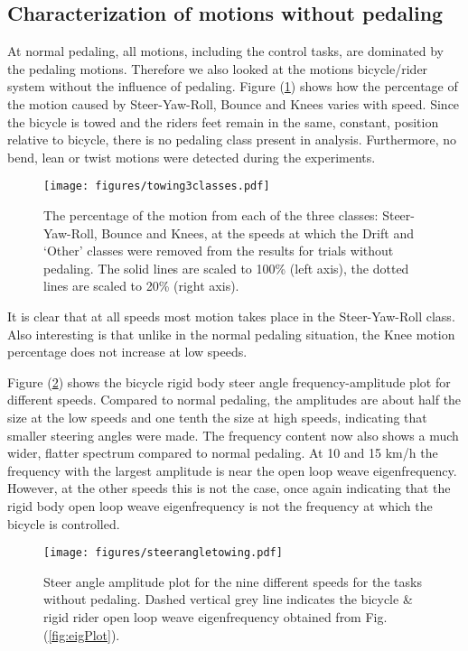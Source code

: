\subsection{Characterization of motions without pedaling}
\label{sec:noPed}
At normal pedaling, all motions, including the control tasks, are dominated by
the pedaling motions. Therefore we also looked at the motions bicycle/rider
system without the influence of pedaling. Figure (\ref{missjellybean}) shows
how the percentage of the motion caused by Steer-Yaw-Roll, Bounce and Knees
varies with speed. Since the bicycle is towed and the riders feet remain in the
same, constant, position relative to bicycle, there is no pedaling class
present in analysis. Furthermore, no bend, lean or twist motions were detected
during the experiments.
\begin{figure}[tb]
    \centering
        \texttt{[image: figures/towing3classes.pdf]}\\
    \caption{The percentage of the motion from each of the three classes:
    Steer-Yaw-Roll, Bounce and Knees, at the speeds at which the Drift
    and `Other' classes were removed from the results for trials without
    pedaling. The solid lines are scaled to 100\% (left axis), the dotted lines
    are scaled to 20\% (right axis).}
    \label{missjellybean}
\end{figure}
It is clear that at all speeds most motion takes place in the Steer-Yaw-Roll
class. Also interesting is that unlike in the normal pedaling situation, the
Knee motion percentage does not increase at low speeds.

Figure (\ref{towingsteerangle}) shows the bicycle rigid body steer angle
frequency-amplitude plot for different speeds. Compared to normal pedaling,
the amplitudes are about half the size at the low speeds and one tenth the size
at high speeds, indicating that smaller steering angles were made. The
frequency content now also shows a much wider, flatter spectrum compared to
normal pedaling. At 10 and 15 km/h the frequency with the largest amplitude is
near the open loop weave eigenfrequency. However, at the other speeds this is
not the case, once again indicating that the rigid body open loop weave
eigenfrequency is not the frequency at which the bicycle is controlled.
\begin{figure}[tbp]
    \centering
        \texttt{[image: figures/steerangletowing.pdf]}\\
    \caption{Steer angle amplitude plot for the nine different speeds for the
    tasks without pedaling. Dashed vertical grey line indicates the bicycle \&
    rigid rider open loop weave eigenfrequency obtained from Fig.
    (\ref{fig:eigPlot}).}
    \label{towingsteerangle}
\end{figure}

